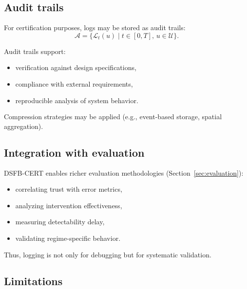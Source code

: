\documentclass[11pt]{article}
\theoremstyle{definition}
\theoremstyle{plain}
\begin{document}

\subsection{Audit trails}

For certification purposes, logs may be stored as audit trails:
\begin{equation}
\mathcal{A} = \{\mathcal{L}_t(u) \mid t\in[0,T],\,u\in\mathcal{U}\}.
\end{equation}

Audit trails support:
\begin{itemize}[leftmargin=1.5em]
    \item verification against design specifications,
    \item compliance with external requirements,
    \item reproducible analysis of system behavior.
\end{itemize}

Compression strategies may be applied (e.g., event-based storage, spatial aggregation).


\subsection{Integration with evaluation}

DSFB-CERT enables richer evaluation methodologies (Section~\ref{sec:evaluation}):
\begin{itemize}[leftmargin=1.5em]
    \item correlating trust with error metrics,
    \item analyzing intervention effectiveness,
    \item measuring detectability delay,
    \item validating regime-specific behavior.
\end{itemize}

Thus, logging is not only for debugging but for systematic validation.


\subsection{Limitations}
\end{document}

